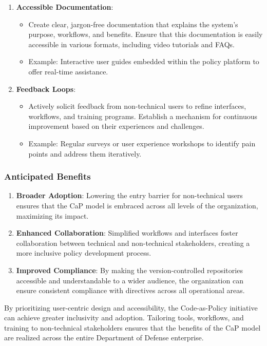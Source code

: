 \documentclass[11pt]{article}
\begin{document}
\begin{enumerate}
\begin{itemize}
		\end{itemize}
		\item \textbf{Accessible Documentation}:
		\begin{itemize}
			\item Create clear, jargon-free documentation that explains the system's purpose, workflows, and benefits. Ensure that this documentation is easily accessible in various formats, including video tutorials and FAQs.
			\item Example: Interactive user guides embedded within the policy platform to offer real-time assistance.
		\end{itemize}
		\item \textbf{Feedback Loops}:
		\begin{itemize}
			\item Actively solicit feedback from non-technical users to refine interfaces, workflows, and training programs. Establish a mechanism for continuous improvement based on their experiences and challenges.
			\item Example: Regular surveys or user experience workshops to identify pain points and address them iteratively.
		\end{itemize}
	\end{enumerate}

	\subsubsection{Anticipated Benefits}
	\begin{enumerate}
		\item \textbf{Broader Adoption}: Lowering the entry barrier for non-technical users ensures that the CaP model is embraced across all levels of the organization, maximizing its impact.
		\item \textbf{Enhanced Collaboration}: Simplified workflows and interfaces foster collaboration between technical and non-technical stakeholders, creating a more inclusive policy development process.
		\item \textbf{Improved Compliance}: By making the version-controlled repositories accessible and understandable to a wider audience, the organization can ensure consistent compliance with directives across all operational areas.
	\end{enumerate}

	By prioritizing user-centric design and accessibility, the Code-as-Policy initiative can achieve greater inclusivity and adoption. Tailoring tools, workflows, and training to non-technical stakeholders ensures that the benefits of the CaP model are realized across the entire Department of Defense enterprise.
\end{document}

